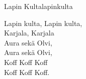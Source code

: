 \begin{song}{Lapin Kulta}{lapinkulta}
\begin{vers}
Lapin kulta, Lapin kulta,\\
Karjala, Karjala\\
Aura sekä Olvi,\\
Aura sekä Olvi,\\
Koff Koff Koff\\
Koff Koff Koff.\\
\end{vers}
\end{song}

